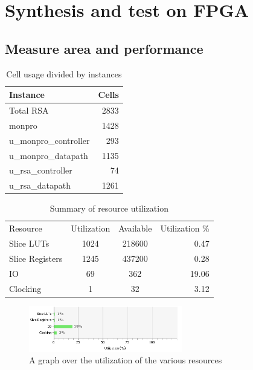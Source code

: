 \section{Synthesis and test on FPGA}
\subsection{Measure area and performance}
%
\begin{table}[htp]
    \begin{center}
        \begin{tabular}{l | r}
            Instance                     & Cells \\
            \hline
            Total RSA                    & 2833 \\
            \quad monpro                 & 1428 \\
            \qquad u\_monpro\_controller & 293  \\
            \qquad u\_monpro\_datapath   & 1135 \\
            \quad u\_rsa\_controller     & 74   \\
            \quad u\_rsa\_datapath       & 1261 \\
        \end{tabular}
        \caption{Cell usage divided by instances}
        \label{tab:cell_usage}
    \end{center}
\end{table}

\begin{table}[htp]
    \begin{center}  
        \begin{tabular}{ l | c | c | r}
             Resource & Utilization & Available & Utilization \%  \\
             Slice LUTs & 1024 & 218600 & 0.47 \\
             Slice Registers & 1245 & 437200 & 0.28 \\
             IO & 69 & 362 & 19.06 \\
             Clocking & 1 & 32 & 3.12 \\
        \end{tabular}
        \caption{Summary of resource utilization }
        \label{tab:resource_utilization}
    \end{center}
\end{table}
%
\begin{figure}[htp]
    \centering
    \includegraphics[width=0.6\textwidth]{images/utilization}
    \caption{A graph over the utilization of the various resources}
    \label{fig:utilization}
\end{figure}

